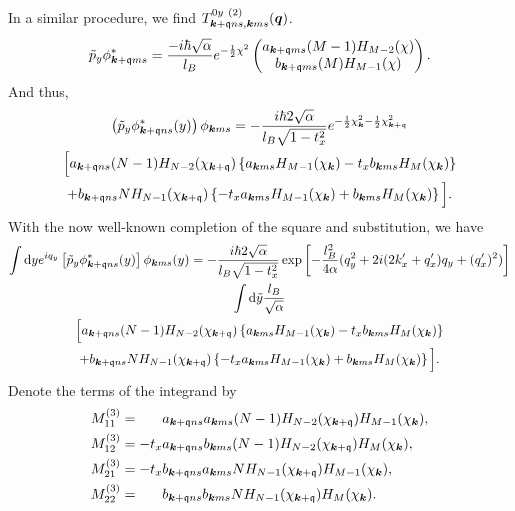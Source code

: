 In a similar procedure, we find \( T^{0y~(2)}_{\bm{k}+\mathfrak{q} ns, \bm{k} ms}(\bm{q}) \).
\begin{equation}
  \tilde{p}_y \phi^{*}_{\bm{k}+\mathfrak{q} m s} = \frac{-i \hbar \sqrt{\alpha } }{l_{B}}  e^{-\frac{1}{2} \chi ^2}
                                   \begin{pmatrix}
                                     a_{\bm{k}+\mathfrak{q} m s} (M-1) H_{M-2} (\chi) \\
                                     b_{\bm{k}+\mathfrak{q} m s} (M) H_{M-1} (\chi)
                                   \end{pmatrix}.
\end{equation}
And thus,
\begin{multline}
  \left( \tilde{p}_y \phi ^{*} _{\bm{k} + \mathfrak{q} ns} (y) \right) \phi _{\bm{k} m s}
  = -\frac{i\hbar 2 \sqrt{\alpha } }{l_{B} \sqrt{1 - t_{x}^2} }
  e^{-\frac{1}{2} \chi _{\bm{k}}^2 - \frac{1}{2} \chi _{\bm{k} + \mathfrak{q}} ^2}\\
  \Big[
  a_{\bm{k} + \mathfrak{q} ns} (N-1) H_{N-2}(\chi_{\bm{k}+\mathfrak{q}})
  \left\{a_{\bm{k} ms} H_{M-1} (\chi_{\bm{k}}) - t_{x} b_{\bm{k} ms} H_{M} (\chi_{\bm{k}})\right\}\\
  +
  b_{\bm{k} + \mathfrak{q} ns} N H_{N-1} (\chi_{\bm{k} + \mathfrak{q}})
  \left\{-t_{x} a_{\bm{k} ms}  H_{M-1} (\chi_{\bm{k}}) + b_{\bm{k} ms} H_{M} (\chi_{\bm{k}})\right\}
  \Big].
\end{multline}
With the now well-known completion of the square and substitution, we have
\begin{multline}
  \int \mathrm{d}y
  e^{i q_{y}}
  \left[\tilde{p}_y \phi ^{*}_{\bm{k} + \mathfrak{q} ns}(y) \right]
  \phi_{\bm{k} ms} (y)
  =
  - \frac{i\hbar 2 \sqrt{\alpha} }{l_{B} \sqrt{1 - t_{x}^2} }
  \exp
  \left[
    - \frac{l_{B}^2}{4 \alpha } (q_{y}^2 + 2 i (2k' _x + q' _x) q_{y} + (q' _x)^2 )
  \right  ]\\
  \int \mathrm{d} \tilde{y} \frac{l_{B}}{\sqrt{\alpha } }\\
  \Big[
  a_{\bm{k} + \mathfrak{q} ns} (N-1) H_{N-2}(\chi_{\bm{k}+\mathfrak{q}})
  \left\{a_{\bm{k} ms} H_{M-1} (\chi_{\bm{k}}) - t_{x} b_{\bm{k} ms} H_{M} (\chi_{\bm{k}})\right\}\\
  +
  b_{\bm{k} + \mathfrak{q} ns} N H_{N-1} (\chi_{\bm{k} + \mathfrak{q}})
  \left\{-t_{x} a_{\bm{k} ms}  H_{M-1} (\chi_{\bm{k}}) + b_{\bm{k} ms} H_{M} (\chi_{\bm{k}})\right\}
  \Big].
\end{multline}
Denote the terms of the integrand by
\begin{align}
  M^{(3)}_{11} &= \phantom{-t_x} a_{\bm{k} + \mathfrak{q} ns} a_{\bm{k} ms} (N-1) H_{N-2} (\chi_{\bm{k} + \mathfrak{q}}) H_{M-1} (\chi_{\bm{k}}),\\
  M^{(3)}_{12} &= -t_x a_{\bm{k} + \mathfrak{q} ns} b_{\bm{k} ms} (N-1) H_{N-2} (\chi_{\bm{k} + \mathfrak{q}}) H_{M} (\chi_{\bm{k}}),\\
  M^{(3)}_{21} &= -t_x b_{\bm{k} + \mathfrak{q} ns} a_{\bm{k} ms} N H_{N-1} (\chi_{\bm{k} + \mathfrak{q}}) H_{M-1} (\chi_{\bm{k}}),\\
  M^{(3)}_{22} &= \phantom{-t_x} b_{\bm{k} + \mathfrak{q} ns} b_{\bm{k} ms} N H_{N-1} (\chi_{\bm{k} + \mathfrak{q}}) H_{M} (\chi_{\bm{k}}).
\end{align}

